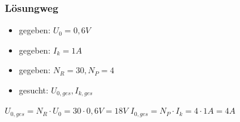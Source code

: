 \begin{frame}
\frametitle{Lösungweg}
\begin{itemize}
  \item gegeben: $U_0 = 0,6V$
  \item gegeben: $I_k = 1A$
  \item gegeben: $N_R = 30, N_P = 4$
  \item gesucht: $U_{0,ges}, I_{k,ges}$
  \end{itemize}
    \pause
    $U_{0,ges} = N_R \cdot U_0 = 30 \cdot 0,6V = 18V$
    \pause
    $I_{0,ges} = N_P \cdot I_k = 4 \cdot 1A = 4A$



\end{frame}%
